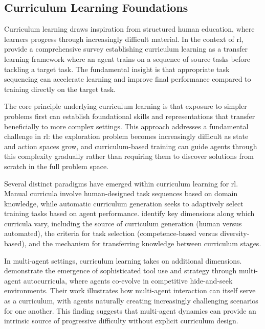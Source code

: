 \subsection{Curriculum Learning Foundations}
\label{subsec:curriculum-foundations}

Curriculum learning draws inspiration from structured human education, 
where learners progress through increasingly difficult material. 
In the context of \gls{rl}, \cite{narvekar2020} provide a comprehensive 
survey establishing curriculum learning as a transfer learning framework where 
an agent trains on a sequence of source tasks before tackling a target task. 
The fundamental insight is that appropriate task sequencing can accelerate learning 
and improve final performance compared to training directly on the target task.

The core principle underlying curriculum learning is that exposure 
to simpler problems first can establish foundational skills and 
representations that transfer beneficially to more complex settings. 
This approach addresses a fundamental challenge in \gls{rl}: 
the exploration problem becomes increasingly difficult as 
state and action spaces grow, and curriculum-based training can 
guide agents through this complexity gradually rather than requiring 
them to discover solutions from scratch in the full problem space.

Several distinct paradigms have emerged within curriculum learning for \gls{rl}. 
Manual curricula involve human-designed task sequences based on domain knowledge, 
while automatic curriculum generation seeks to adaptively select training 
tasks based on agent performance. \cite{narvekar2020} identify key dimensions 
along which curricula vary, including the source of curriculum generation 
(human versus automated), the criteria for task selection 
(competence-based versus diversity-based), and the mechanism for 
transferring knowledge between curriculum stages.

In multi-agent settings, curriculum learning takes on additional dimensions. 
\cite{baker2019} demonstrate the emergence of sophisticated tool use and 
strategy through multi-agent autocurricula, where agents co-evolve in 
competitive hide-and-seek environments. Their work illustrates 
how multi-agent interaction can itself serve as a curriculum, with 
agents naturally creating increasingly challenging scenarios for one another. 
This finding suggests that multi-agent dynamics can provide an intrinsic 
source of progressive difficulty without explicit curriculum design.

